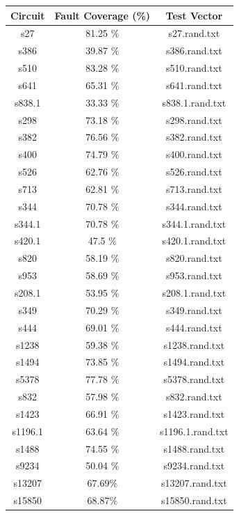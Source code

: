 \documentclass[a4paper,12pt]{article}
\begin{document}
\begin{center}
\begin{tabular}{||c c c||}
\hline
Circuit & Fault Coverage (\%) & Test Vector \\ [0.5ex] 
\hline\hline
s27 & 81.25 \%  & s27.rand.txt \\ 
\hline
s386 & 39.87 \%  & s386.rand.txt \\ 
\hline
s510 & 83.28 \%  & s510.rand.txt \\ 
\hline
s641 & 65.31 \%  & s641.rand.txt \\ 
\hline
s838.1 & 33.33 \%  & s838.1.rand.txt \\ 
\hline
s298 & 73.18 \%  & s298.rand.txt \\ 
\hline
s382 & 76.56 \%  & s382.rand.txt \\ 
\hline
s400 & 74.79 \%  & s400.rand.txt \\ 
\hline
s526 & 62.76 \%  & s526.rand.txt \\ 
\hline
s713 & 62.81 \%  & s713.rand.txt \\ 
\hline
s344 & 70.78 \%  & s344.rand.txt \\ 
\hline
s344.1 & 70.78 \%  & s344.1.rand.txt \\ 
\hline
s420.1 & 47.5 \%  & s420.1.rand.txt \\ 
\hline
s820 & 58.19 \%  & s820.rand.txt \\ 
\hline
s953 & 58.69 \%  & s953.rand.txt \\ 
\hline
s208.1 & 53.95 \%  & s208.1.rand.txt \\ 
\hline
s349 & 70.29 \%  & s349.rand.txt \\ 
\hline
s444 & 69.01 \%  & s444.rand.txt \\ 
\hline
s1238 & 59.38 \%  & s1238.rand.txt \\ 
\hline
s1494 & 73.85 \%  & s1494.rand.txt \\ 
\hline
s5378 & 77.78 \%  & s5378.rand.txt \\ 
\hline
s832 & 57.98 \%  & s832.rand.txt \\ 
\hline
s1423 & 66.91 \%  & s1423.rand.txt \\ 
\hline
s1196.1 & 63.64 \%  & s1196.1.rand.txt \\ 
\hline
s1488 & 74.55 \%  & s1488.rand.txt \\ 
\hline
s9234 & 50.04 \%  & s9234.rand.txt \\ 
\hline
s13207 & 67.69\% & s13207.rand.txt \\
\hline
s15850 & 68.87\% & s15850.rand.txt \\

\end{tabular}
\end{center}
\end{document}
